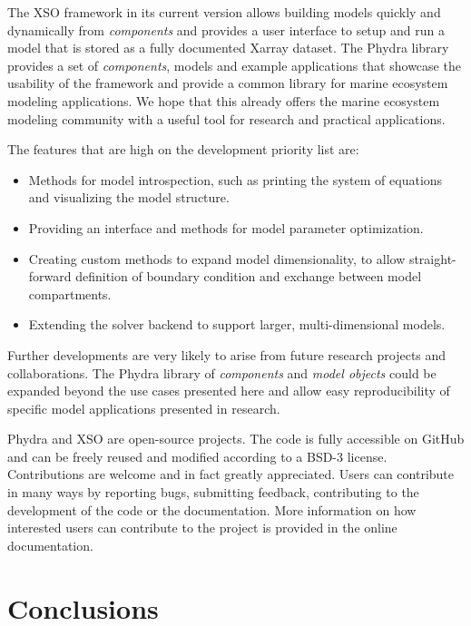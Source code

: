 \documentclass[journal abbreviation, manuscript]{copernicus}
\begin{document}
The XSO framework in its current version allows building models quickly and dynamically from \textit{components} and provides a user interface to setup and run a model that is stored as a fully documented Xarray dataset. The Phydra library provides a set of \textit{components}, models and example applications that showcase the usability of the framework and provide a common library for marine ecosystem modeling applications. We hope that this already offers the marine ecosystem modeling community with a useful tool for research and practical applications. 

The features that are high on the development priority list are: 
\begin{itemize}
    \item Methods for model introspection, such as printing the system of equations and visualizing the model structure.
    \item Providing an interface and methods for model parameter optimization.
    \item Creating custom methods to expand model dimensionality, to allow straight-forward definition of boundary condition and exchange between model compartments.
    \item Extending the solver backend to support larger, multi-dimensional models.
\end{itemize}
Further developments are very likely to arise from future research projects and collaborations. The Phydra library of \textit{components} and \textit{model objects} could be expanded beyond the use cases presented here and allow easy reproducibility of specific model applications presented in research.

Phydra and XSO are open-source projects. The code is fully accessible on GitHub and can be freely reused and modified according to a BSD-3 license. Contributions are welcome and in fact greatly appreciated. Users can contribute in many ways by reporting bugs, submitting feedback, contributing to the development of the code or the documentation. More information on how interested users can contribute to the project is provided in the online documentation.


\section{Conclusions}
\end{document}

